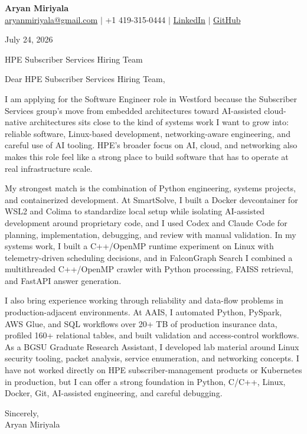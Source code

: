 \documentclass[letterpaper,11pt]{article}
\begin{document}
{\Large\textbf{Aryan Miriyala}}\\
\href{mailto:aryanmiriyala@gmail.com}{aryanmiriyala@gmail.com} $|$ +1 419-315-0444 $|$
\href{https://www.linkedin.com/in/aryan-miriyala-7788a21b6/}{LinkedIn} $|$
\href{https://github.com/aryanmiriyala}{GitHub}

July 24, 2026

HPE Subscriber Services Hiring Team

Dear HPE Subscriber Services Hiring Team,

I am applying for the Software Engineer role in Westford because the Subscriber Services group's move from embedded architectures toward AI-assisted cloud-native architectures sits close to the kind of systems work I want to grow into: reliable software, Linux-based development, networking-aware engineering, and careful use of AI tooling. HPE's broader focus on AI, cloud, and networking also makes this role feel like a strong place to build software that has to operate at real infrastructure scale.

My strongest match is the combination of Python engineering, systems projects, and containerized development. At SmartSolve, I built a Docker devcontainer for WSL2 and Colima to standardize local setup while isolating AI-assisted development around proprietary code, and I used Codex and Claude Code for planning, implementation, debugging, and review with manual validation. In my systems work, I built a C++/OpenMP runtime experiment on Linux with telemetry-driven scheduling decisions, and in FalconGraph Search I combined a multithreaded C++/OpenMP crawler with Python processing, FAISS retrieval, and FastAPI answer generation.

I also bring experience working through reliability and data-flow problems in production-adjacent environments. At AAIS, I automated Python, PySpark, AWS Glue, and SQL workflows over 20+ TB of production insurance data, profiled 160+ relational tables, and built validation and access-control workflows. As a BGSU Graduate Research Assistant, I developed lab material around Linux security tooling, packet analysis, service enumeration, and networking concepts. I have not worked directly on HPE subscriber-management products or Kubernetes in production, but I can offer a strong foundation in Python, C/C++, Linux, Docker, Git, AI-assisted engineering, and careful debugging.

Sincerely,\\
Aryan Miriyala
\end{document}
